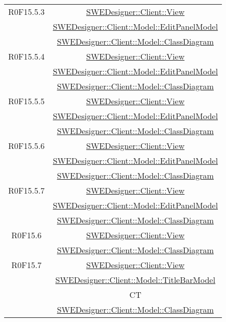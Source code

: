 \documentclass[../SpecificaTecnica.tex]{subfiles}
\begin{document}
\begin{longtable}{|c|c|}
		R0F15.5.3 & \hyperlink{SWEDesigner::Client::View}{SWEDesigner::Client::View}\\& \hyperlink{SWEDesigner::Client::Model::EditPanelModel}{SWEDesigner::Client::Model::EditPanelModel}\\& \hyperlink{SWEDesigner::Client::Model::ClassDiagram}{SWEDesigner::Client::Model::ClassDiagram} \\\hline
		R0F15.5.4 & \hyperlink{SWEDesigner::Client::View}{SWEDesigner::Client::View}\\& \hyperlink{SWEDesigner::Client::Model::EditPanelModel}{SWEDesigner::Client::Model::EditPanelModel}\\& \hyperlink{SWEDesigner::Client::Model::ClassDiagram}{SWEDesigner::Client::Model::ClassDiagram} \\\hline
		R0F15.5.5 & \hyperlink{SWEDesigner::Client::View}{SWEDesigner::Client::View}\\& \hyperlink{SWEDesigner::Client::Model::EditPanelModel}{SWEDesigner::Client::Model::EditPanelModel}\\& \hyperlink{SWEDesigner::Client::Model::ClassDiagram}{SWEDesigner::Client::Model::ClassDiagram} \\\hline
		R0F15.5.6 & \hyperlink{SWEDesigner::Client::View}{SWEDesigner::Client::View}\\& \hyperlink{SWEDesigner::Client::Model::EditPanelModel}{SWEDesigner::Client::Model::EditPanelModel}\\& \hyperlink{SWEDesigner::Client::Model::ClassDiagram}{SWEDesigner::Client::Model::ClassDiagram} \\\hline
		R0F15.5.7 & \hyperlink{SWEDesigner::Client::View}{SWEDesigner::Client::View}\\& \hyperlink{SWEDesigner::Client::Model::EditPanelModel}{SWEDesigner::Client::Model::EditPanelModel}\\& \hyperlink{SWEDesigner::Client::Model::ClassDiagram}{SWEDesigner::Client::Model::ClassDiagram} \\\hline
		R0F15.6 & \hyperlink{SWEDesigner::Client::View}{SWEDesigner::Client::View}\\& \hyperlink{SWEDesigner::Client::Model::ClassDiagram}{SWEDesigner::Client::Model::ClassDiagram}\\\hline
		R0F15.7 & \hyperlink{SWEDesigner::Client::View}{SWEDesigner::Client::View}\\& \hyperlink{SWEDesigner::Client::Model::TitleBarModel}{SWEDesigner::Client::Model::TitleBarModel}\\& CT\\& \hyperlink{SWEDesigner::Client::Model::ClassDiagram}{SWEDesigner::Client::Model::ClassDiagram}\\\hline

\end{longtable}
\end{document}
